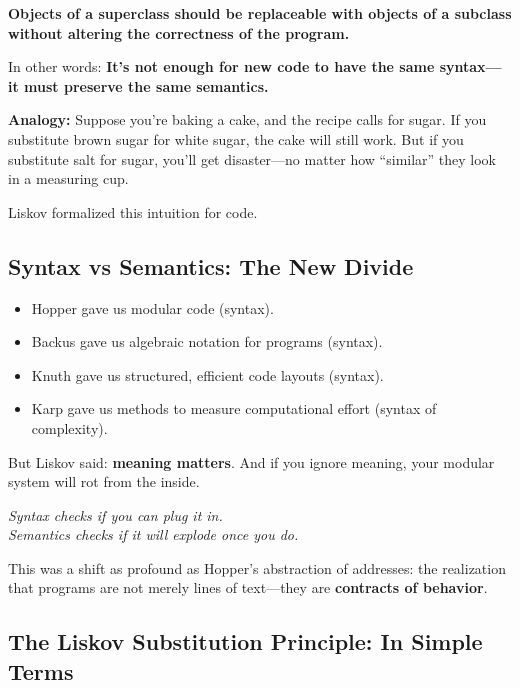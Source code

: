 \begin{center}
\textbf{Objects of a superclass should be replaceable with objects of a subclass without altering the correctness of the program.}
\end{center}

In other words: \textbf{It’s not enough for new code to have the same syntax—it must preserve the same semantics.}

\medskip

\noindent\textbf{Analogy:} Suppose you’re baking a cake, and the recipe calls for sugar. If you substitute brown sugar for white sugar, the cake will still work. But if you substitute salt for sugar, you’ll get disaster—no matter how “similar” they look in a measuring cup.

Liskov formalized this intuition for code.

\subsection{Syntax vs Semantics: The New Divide}

\begin{itemize}
  \item Hopper gave us modular code (syntax).
  \item Backus gave us algebraic notation for programs (syntax).
  \item Knuth gave us structured, efficient code layouts (syntax).
  \item Karp gave us methods to measure computational effort (syntax of complexity).
\end{itemize}

But Liskov said: \textbf{meaning matters}.  
And if you ignore meaning, your modular system will rot from the inside.

\begin{center}
\textit{Syntax checks if you can plug it in.\\
Semantics checks if it will explode once you do.}
\end{center}

This was a shift as profound as Hopper’s abstraction of addresses: the realization that programs are not merely lines of text—they are \textbf{contracts of behavior}.

\subsection{The Liskov Substitution Principle: In Simple Terms}

